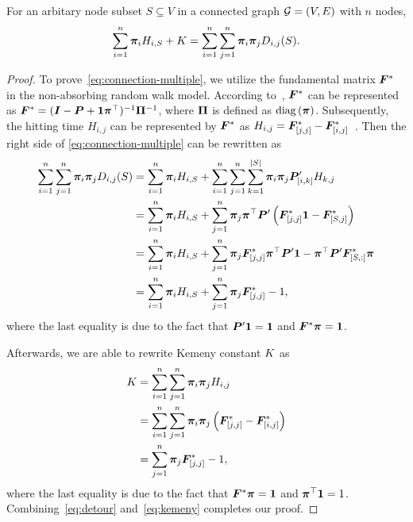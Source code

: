 \documentclass[sigconf]{acmart}
\begin{document}
\begin{theorem}\label{thm:connection-multiple}
  For an arbitary node subset \(S\subseteq V\) in a connected graph \(\mathcal{G}=(V,E)\) with \(n\) nodes,
  \begin{equation}\label{eq:connection-multiple}
    \sum_{i=1}^n\boldsymbol{\pi}_iH_{i,S}+K=\sum_{i=1}^n\sum_{j=1}^n\boldsymbol{\pi}_i\boldsymbol{\pi}_jD_{i,j}(S).
  \end{equation}
\end{theorem}
\begin{proof}
  To prove~\eqref{eq:connection-multiple}, we utilize the fundamental matrix \(\boldsymbol{F}^*\) in the non-absorbing random walk model.
  According to~\cite{BoRaZh11}, \(\boldsymbol{F}^*\) can be represented as \(\boldsymbol{F}^*=(\boldsymbol{I}-\boldsymbol{P}+\boldsymbol{1}\boldsymbol{\pi}^\top)^{-1}\boldsymbol{\Pi}^{-1}\), where \(\boldsymbol{\Pi}\) is defined as \(\rm{diag}\left( \boldsymbol{\pi} \right)\).
  Subsequently, the hitting time \(H_{i,j}\) can be represented by \(\boldsymbol{F}^*\) as \(H_{i,j}=\boldsymbol{F}^*_{[j,j]}-\boldsymbol{F}^*_{[i,j]}\)~\cite{BoRaZh11}.
  Then the right side of \eqref{eq:connection-multiple} can be rewritten as
  \begin{equation}\label{eq:detour}
    \begin{split}
      \sum_{i=1}^n\sum_{j=1}^n\boldsymbol{\pi}_i\boldsymbol{\pi}_jD_{i,j}(S)
      & =\sum_{i=1}^n\boldsymbol{\pi}_i H_{i,S}+\sum_{i=1}^n\sum_{j=1}^n\sum_{k=1}^{\left|S \right|}\boldsymbol{\pi}_i\boldsymbol{\pi}_j\boldsymbol{P}'_{[i,k]}H_{k,j}  \\
      & =\sum_{i=1}^n\boldsymbol{\pi}_i H_{i,S}+\sum_{j=1}^n\boldsymbol{\pi}_j\boldsymbol{\pi}^\top\boldsymbol{P}'\left( \boldsymbol{F}^*_{[j,j]}\boldsymbol{1}-\boldsymbol{F}^*_{[S,j]} \right)                        \\
      & =\sum_{i=1}^n\boldsymbol{\pi}_i H_{i,S}+\sum_{j=1}^n\boldsymbol{\pi}_j\boldsymbol{F}^*_{[j,j]}\boldsymbol{\pi}^\top\boldsymbol{P}'\boldsymbol{1}-\boldsymbol{\pi}^\top\boldsymbol{P}'\boldsymbol{F}^*_{[S,:]}\boldsymbol{\pi} \\
      & =\sum_{i=1}^n\boldsymbol{\pi}_i H_{i,S}+\sum_{j=1}^n\boldsymbol{\pi}_j\boldsymbol{F}^*_{[j,j]}-1,
    \end{split}
  \end{equation}
  where the last equality is due to the fact that \(\boldsymbol{P}'\boldsymbol{1}=\boldsymbol{1}\) and \(\boldsymbol{F}^*\boldsymbol{\pi}=\boldsymbol{1}\).

  Afterwards, we are able to rewrite Kemeny constant \(K\) as
  \begin{equation}\label{eq:kemeny}
    \begin{split}
      K&=\sum_{i=1}^n\sum_{j=1}^n\boldsymbol{\pi}_i\boldsymbol{\pi}_jH_{i,j}\\
      &=\sum_{i=1}^n\sum_{j=1}^n\boldsymbol{\pi}_i\boldsymbol{\pi}_j\left( \boldsymbol{F}^*_{[j,j]}-\boldsymbol{F}^*_{[i,j]} \right)\\
      &=\sum_{j=1}^n\boldsymbol{\pi}_j\boldsymbol{F}^*_{[j,j]}-1,
    \end{split}
  \end{equation}
  where the last equality is due to the fact that \(\boldsymbol{F}^*\boldsymbol{\pi}=\boldsymbol{1}\) and \(\boldsymbol{\pi}^\top\boldsymbol{1}=1\).
  Combining~\eqref{eq:detour} and~\eqref{eq:kemeny} completes our proof.
\end{proof}
\end{document}
